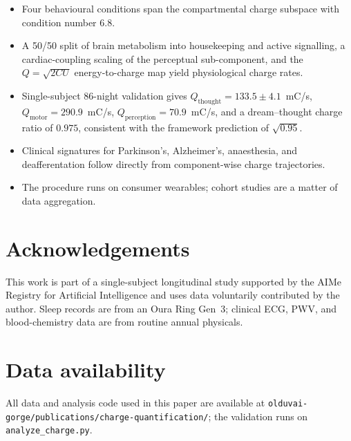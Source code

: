 \documentclass[11pt,twocolumn,a4paper]{article}
\theoremstyle{definition}
\theoremstyle{remark}
\newcommand{\Qth}{Q_{\mathrm{thought}}}
\newcommand{\Qmo}{Q_{\mathrm{motor}}}
\newcommand{\Qpe}{Q_{\mathrm{perception}}}
\begin{document}
\begin{itemize}[leftmargin=1.3em]
  \item Four behavioural conditions span the compartmental charge
  subspace with condition number $6.8$.
  \item A 50/50 split of brain metabolism into housekeeping and
  active signalling, a cardiac-coupling scaling of the perceptual
  sub-component, and the $Q=\sqrt{2CU}$ energy-to-charge map yield
  physiological charge rates.
  \item Single-subject 86-night validation gives
  $\Qth=133.5\pm 4.1$~mC/s, $\Qmo=290.9$~mC/s,
  $\Qpe=70.9$~mC/s, and a dream--thought charge ratio of
  $0.975$, consistent with the framework prediction of
  $\sqrt{0.95}$.
  \item Clinical signatures for Parkinson's, Alzheimer's, anaesthesia,
  and deafferentation follow directly from component-wise charge
  trajectories.
  \item The procedure runs on consumer wearables; cohort studies are
  a matter of data aggregation.
\end{itemize}

\section*{Acknowledgements}

This work is part of a single-subject longitudinal study supported by
the AIMe Registry for Artificial Intelligence and uses data
voluntarily contributed by the author. Sleep records are from an
Oura Ring Gen~3; clinical ECG, PWV, and blood-chemistry data are
from routine annual physicals.

\section*{Data availability}

All data and analysis code used in this paper are available at
\texttt{olduvai-gorge/publications/charge-quantification/}; the
validation runs on \texttt{analyze\_charge.py}.



\end{document}
